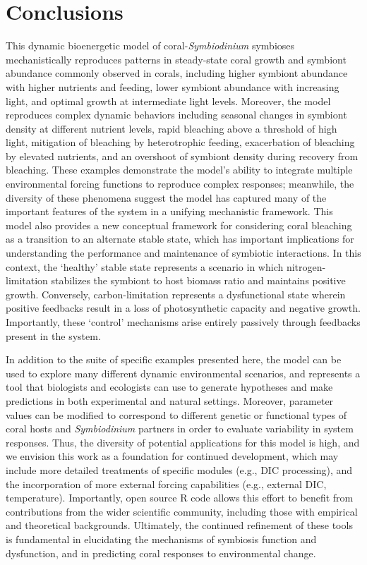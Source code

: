 \documentclass[]{elsarticle} %
\begin{document}
\section{Conclusions}\label{conclusions}

This dynamic bioenergetic model of coral-\emph{Symbiodinium} symbioses
mechanistically reproduces patterns in steady-state coral growth and
symbiont abundance commonly observed in corals, including higher
symbiont abundance with higher nutrients and feeding, lower symbiont
abundance with increasing light, and optimal growth at intermediate
light levels. Moreover, the model reproduces complex dynamic behaviors
including seasonal changes in symbiont density at different nutrient
levels, rapid bleaching above a threshold of high light, mitigation of
bleaching by heterotrophic feeding, exacerbation of bleaching by
elevated nutrients, and an overshoot of symbiont density during recovery
from bleaching. These examples demonstrate the model's ability to
integrate multiple environmental forcing functions to reproduce complex
responses; meanwhile, the diversity of these phenomena suggest the model
has captured many of the important features of the system in a unifying
mechanistic framework. This model also provides a new conceptual
framework for considering coral bleaching as a transition to an
alternate stable state, which has important implications for
understanding the performance and maintenance of symbiotic interactions.
In this context, the `healthy' stable state represents a scenario in
which nitrogen-limitation stabilizes the symbiont to host biomass ratio
and maintains positive growth. Conversely, carbon-limitation represents
a dysfunctional state wherein positive feedbacks result in a loss of
photosynthetic capacity and negative growth. Importantly, these
`control' mechanisms arise entirely passively through feedbacks present
in the system.

In addition to the suite of specific examples presented here, the model
can be used to explore many different dynamic environmental scenarios,
and represents a tool that biologists and ecologists can use to generate
hypotheses and make predictions in both experimental and natural
settings. Moreover, parameter values can be modified to correspond to
different genetic or functional types of coral hosts and
\emph{Symbiodinium} partners in order to evaluate variability in system
responses. Thus, the diversity of potential applications for this model
is high, and we envision this work as a foundation for continued
development, which may include more detailed treatments of specific
modules (e.g., DIC processing), and the incorporation of more external
forcing capabilities (e.g., external DIC, temperature). Importantly,
open source R code allows this effort to benefit from contributions from
the wider scientific community, including those with empirical and
theoretical backgrounds. Ultimately, the continued refinement of these
tools is fundamental in elucidating the mechanisms of symbiosis function
and dysfunction, and in predicting coral responses to environmental
change.
\end{document}
